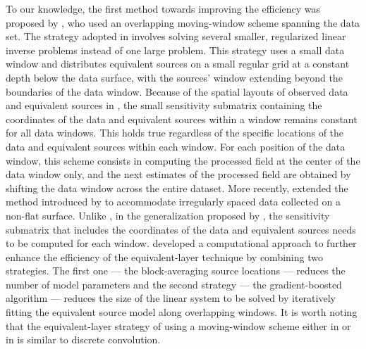 To our knowledge, the first method towards improving the efficiency  was proposed by \cite{leao-silva1989}, 
who used an overlapping moving-window scheme spanning the data set. 
The strategy adopted in \cite{leao-silva1989} involves solving several smaller, regularized linear 
inverse problems instead of one large problem. 
This strategy uses a small data window and distributes equivalent sources 
on a small regular grid at a constant depth below the data surface, with the sources' window extending beyond 
the boundaries of the data window.
Because of the spatial layouts of observed data and equivalent sources in \cite{leao-silva1989}, the small 
sensitivity submatrix containing the coordinates of the data and equivalent sources within a window remains 
constant for all data windows. This holds true regardless  of the specific locations of the data and equivalent 
sources within each window.
For each position of the data window, this scheme consists in computing the processed field 
at the center of the data window only, and the next estimates of the processed field are 
obtained by shifting the data window across the entire dataset. 
More recently, \cite{soler-uieda2021} extended the method introduced by \cite{leao-silva1989} to accommodate 
irregularly spaced data collected on a non-flat surface.
Unlike  \cite{leao-silva1989}, in the generalization proposed by \cite{soler-uieda2021}, the sensitivity 
submatrix that includes the coordinates of the data and equivalent sources needs to be computed for each window.
\cite{soler-uieda2021}  developed a computational approach to further enhance the efficiency of the 
equivalent-layer technique by combining two strategies. 
The first one --- the block-averaging source locations --- reduces the number of model parameters and the second 
strategy --- the gradient-boosted algorithm --- reduces the size of the linear system to be solved by 
iteratively fitting the equivalent source model along overlapping windows. 
It is worth noting that the equivalent-layer strategy of using a moving-window scheme either in 
\cite{leao-silva1989} or in \cite{soler-uieda2021} is similar to discrete convolution.

